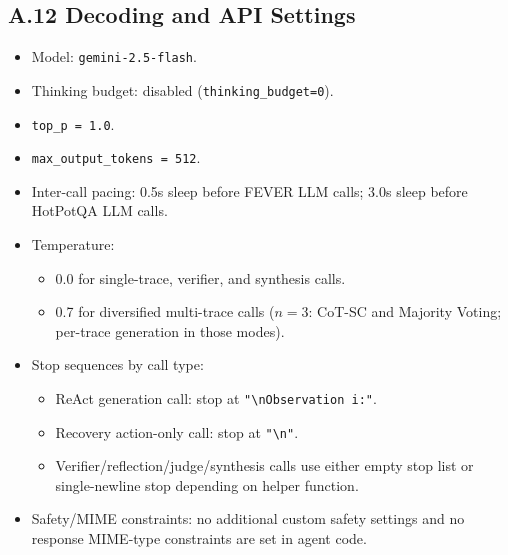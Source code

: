 \subsection{A.12 Decoding and API Settings}
\begin{itemize}
\item Model: \texttt{gemini-2.5-flash}.
\item Thinking budget: disabled (\texttt{thinking\_budget=0}).
\item \texttt{top\_p = 1.0}.
\item \texttt{max\_output\_tokens = 512}.
\item Inter-call pacing: 0.5s sleep before FEVER LLM calls; 3.0s sleep before HotPotQA LLM calls.
\item Temperature:
  \begin{itemize}
  \item 0.0 for single-trace, verifier, and synthesis calls.
  \item 0.7 for diversified multi-trace calls (\(n=3\): CoT-SC and Majority Voting; per-trace generation in those modes).
  \end{itemize}
\item Stop sequences by call type:
  \begin{itemize}
  \item ReAct generation call: stop at \texttt{"\textbackslash nObservation i:"}.
  \item Recovery action-only call: stop at \texttt{"\textbackslash n"}.
  \item Verifier/reflection/judge/synthesis calls use either empty stop list or single-newline stop depending on helper function.
  \end{itemize}
\item Safety/MIME constraints: no additional custom safety settings and no response MIME-type constraints are set in agent code.
\end{itemize}

